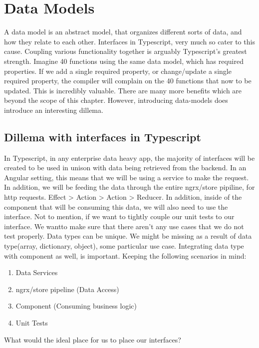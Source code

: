 \section{ Data Models }
\maketitle{}

A data model is an abstract model, that organizes different sorts of data,
and how they relate to each other. Interfaces in Typescript, very much so cater
to this cause. Coupling various functionality together is arguably Typescript's
greatest strength. Imagine 40 functions using the same data model, which has
required properties. If we add a single required property, or change/update
a single required property, the compiler will complain on the 40 functions that
now to be updated. This is incredibly valuable. There are many more benefits
which are beyond the scope of this chapter. However, introducing data-models
does introduce an interesting dillema.

\subsection{Dillema with interfaces in Typescript}
In Typescript, in any enterprise data heavy app, the majority of interfaces will
be created to be used in unison with data being retrieved from the backend.
In an Angular setting, this means that we will be using a service to make the
request. In addition, we will be feeding the data through the entire ngrx/store
pipiline, for http requests. Effect > Action > Action > Reducer. In addition,
inside of the component that will be consuming this data, we will also need
to use the interface. Not to mention, if we want to tightly couple our unit
tests to our interface. We wantto make sure that there aren't any use cases
that we do not test properly. Data types can be unique. We might be missing as a result of data type(array, dictionary, object), some particular use case.
Integrating data type with component as well, is important. Keeping the
following scenarios in mind:
\begin{enumerate}
  \item Data Services
  \item ngrx/store pipeline (Data Access)
  \item Component (Consuming business logic)
  \item Unit Tests
\end{enumerate}

What would the ideal place for us to place our interfaces?
